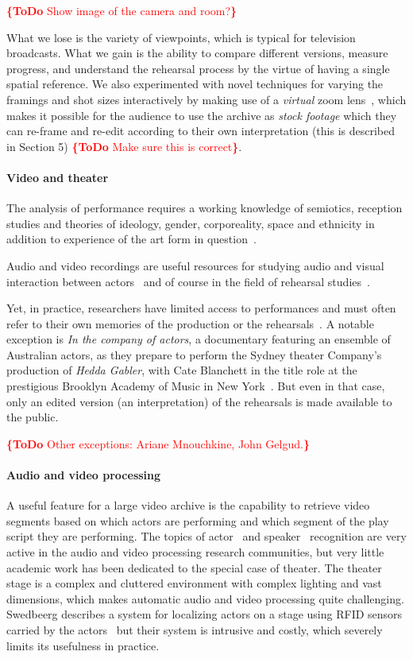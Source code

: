 \documentclass[conference]{IEEEtran}
\newcommand{\todo}[1]{\noindent\textcolor{red}{{\bf \{ToDo} #1{\bf \}}}}
\begin{document}
\todo{Show image of the camera and room?}

What we lose is the variety of viewpoints, which is typical for television broadcasts. What we gain is the ability to compare different versions, measure progress, and understand the rehearsal process by the virtue of having a single spatial reference.
We also experimented with novel techniques for varying the framings and shot sizes interactively 
by making use of a {\em virtual}  zoom lens~\cite{Gandhi14}, which makes it possible for the audience to
use the archive as {\em stock footage} which they can re-frame and re-edit according to their own interpretation (this is described in Section 5) \todo{Make sure this is correct}. 


\paragraph*{Video and theater}

The analysis of performance requires a working knowledge of semiotics, reception studies and theories 
of ideology, gender, corporeality, space and ethnicity in addition to experience of the art form in question~\cite{Auslander97,Counsell01}.

Audio and video recordings are useful resources for studying audio and visual interaction between actors~\cite{Fitzpatrick90}
and of course in the field of rehearsal studies~\cite{McAuley98a,McAuley98b,McAuley06,McAuley08}.

Yet, in practice, researchers have limited access to performances and must often refer to their own memories of the production or the rehearsals~\cite{Selbourne82,Sher85,Stafford00,Stern00}. A notable exception is {\em In the company of actors}, a documentary featuring an ensemble of Australian actors, as they prepare to perform the Sydney theater Company's production of \emph{Hedda Gabler}, with Cate Blanchett in the title role at the prestigious Brooklyn Academy of Music  in New York~\cite{Darling07}. But even in that case, only an edited version (an interpretation)  of the rehearsals is made available to the public. 

\todo{Other exceptions: Ariane Mnouchkine, John Gelgud.}

\paragraph*{Audio and video processing}
A useful feature for a large video archive is the capability to retrieve video segments based on which actors 
are performing and which segment of the play script they are performing. The topics of actor~\cite{Hilton06} and speaker~\cite{Miro12} recognition are very active in the audio and video processing research communities, but very little academic 
work has been dedicated to the special case of theater. The theater stage is a complex and cluttered environment 
with complex lighting and vast dimensions, which makes automatic audio and video processing quite challenging. 
Swedbeerg describes a system for localizing actors on a stage using RFID sensors carried by the actors~\cite{Swedberg}
but their system is intrusive and costly, which severely limits its usefulness in practice.
\end{document}
